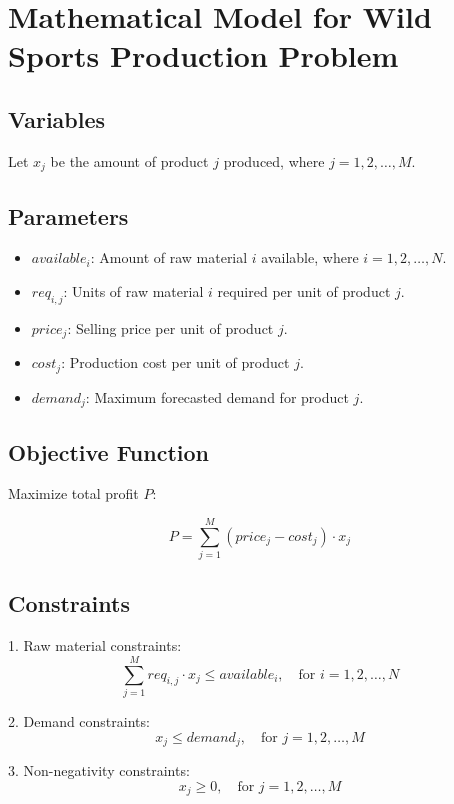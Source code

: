 \documentclass{article}
\begin{document}
\section*{Mathematical Model for Wild Sports Production Problem}

\subsection*{Variables}
Let \( x_j \) be the amount of product \( j \) produced, where \( j = 1, 2, \ldots, M \).

\subsection*{Parameters}
\begin{itemize}
    \item \( available_i \): Amount of raw material \( i \) available, where \( i = 1, 2, \ldots, N \).
    \item \( req_{i,j} \): Units of raw material \( i \) required per unit of product \( j \).
    \item \( price_j \): Selling price per unit of product \( j \).
    \item \( cost_j \): Production cost per unit of product \( j \).
    \item \( demand_j \): Maximum forecasted demand for product \( j \).
\end{itemize}

\subsection*{Objective Function}
Maximize total profit \( P \):

\[
P = \sum_{j=1}^{M} (price_j - cost_j) \cdot x_j
\]

\subsection*{Constraints}
1. Raw material constraints:
\[
\sum_{j=1}^{M} req_{i,j} \cdot x_j \leq available_i, \quad \text{for } i = 1, 2, \ldots, N
\]

2. Demand constraints:
\[
x_j \leq demand_j, \quad \text{for } j = 1, 2, \ldots, M
\]

3. Non-negativity constraints:
\[
x_j \geq 0, \quad \text{for } j = 1, 2, \ldots, M
\]
\end{document}
